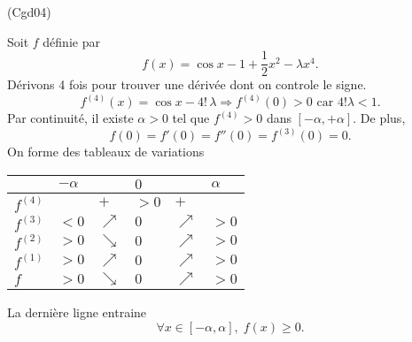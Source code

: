 \begin{tiny}(Cgd04)\end{tiny} Soit $f$ définie par
\[
  f(x) = \cos x - 1 + \frac{1}{2}x^2 - \lambda x^4.
\]
Dérivons 4 fois pour trouver une dérivée dont on controle le signe.
\[
   f^{(4)}(x) = \cos x - 4!\, \lambda \Rightarrow f^{(4)}(0) > 0 \text{ car } 4! \lambda < 1.
\]
Par continuité, il existe $\alpha >0$ tel que $f^{(4)}>0$ dans $\left[ - \alpha, +\alpha\right]$. De plus,
\[
  f(0) = f'(0) = f''(0) = f^{(3)}(0) = 0.
\]
On forme des tableaux de variations
\begin{center}
\renewcommand{\arraystretch}{1.5}
\begin{tabular}{l|lllll}
          & $-\alpha$ &            & $0$ &            & $\alpha$ \\ \hline
$f^{(4)}$ &           & $+$        & $>0$& $+$        &          \\ \hline
$f^{(3)}$ &  $<0$     & $\nearrow$ & $0$ & $\nearrow$ & $>0$     \\ \hline
$f^{(2)}$ &  $>0$     & $\searrow$ & $0$ & $\nearrow$ & $>0$     \\ \hline
$f^{(1)}$ &  $>0$     & $\nearrow$ & $0$ & $\nearrow$ & $>0$     \\ \hline
$f$      &  $>0$     & $\searrow$ & $0$ & $\nearrow$ & $>0$     \\ \hline
\end{tabular}
\end{center}
La dernière ligne entraine
\[
  \forall x \in \left[-\alpha, \alpha \right], \; f(x)\geq 0.
\]
